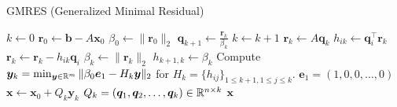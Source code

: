 \begin{algorithm}[tp]
    \caption{GMRES (Generalized Minimal Residual) \cite{Golub2013,Blom2013}}
    \label{alg:ode_runge-kutta_gmres}
    \begin{algorithmic}
        \State $k \gets 0$
        \State $\bm{r}_0 \gets \bm{b} - A \bm{x}_0$
        \State $\beta_0 \gets \|\bm{r}_0\|_2$
        \State $\bm{q}_{k+1} \gets \frac{\bm{r}_k}{\beta_k}$
        \State $k \gets k + 1$
        \State $\bm{r}_k \gets A \bm{q}_k$
        \State $h_{ik} \gets \bm{q}_i^\top \bm{r}_k$
        \State $\bm{r}_k \gets \bm{r}_k - h_{ik} \bm{q}_i$
        \EndFor
        \State $\beta_k \gets \|\bm{r}_k\|_2$
        \State $h_{k+1,k} \gets \beta_k$
        \EndWhile
        \State Compute $\bm{y}_k = \min_{\bm{y} \in \mathbb{R}^m} \|\beta_0 \bm{e}_1 - H_k \bm{y}\|_2$
        for $H_k = \{h_{ij}\}_{1 \le k + 1, 1 \le j \le k}$.
        \Comment $\bm{e}_1 = (1, 0, 0, \ldots, 0)$
        \State $\bm{x} \gets \bm{x}_0 + Q_k \bm{y}_k$
        \Comment $Q_k = (\bm{q}_1, \bm{q}_2, \ldots, \bm{q}_k) \in \mathbb{R}^{n \times k}$
        \State \Return $\bm{x}$
        \EndProcedure
    \end{algorithmic}
\end{algorithm}

